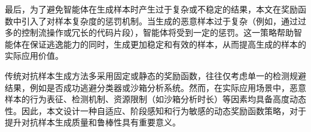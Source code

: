 最后，为了避免智能体在生成样本时产生过于复杂或不稳定的结果，本文在奖励函数中引入了对样本复杂度的惩罚机制。当生成的恶意样本过于复杂（例如，通过过多的控制流操作或冗长的代码片段），智能体将受到一定的惩罚。这一策略帮助智能体在保证逃逸能力的同时，生成更加稳定和有效的样本，从而提高生成的样本的实际应用价值。




传统对抗样本生成方法多采用固定或静态的奖励函数，往往仅考虑单一的检测规避结果，例如是否成功逃避分类器或沙箱分析系统\cite{anderson2018learning}。然而，在实际应用场景中，恶意样本的行为表征、检测机制、资源限制（如沙箱分析时长）等因素均具备高度动态性。因此，本文设计一种自适应、阶段感知和行为敏感的动态奖励函数策略，对于提升对抗样本生成质量和鲁棒性具有重要意义。


